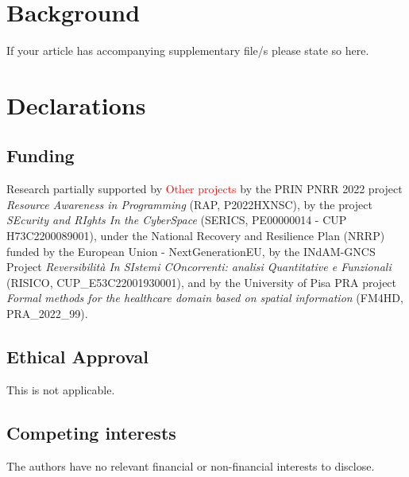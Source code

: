 \documentclass[sn-mathphys-num,a4paper,iicol,lineno,pdflatex]{sn-jnl-hacked}
\theoremstyle{thmwithspace}%
\theoremstyle{thmwithspace}%
\begin{document}
\section{Background}



















\backmatter


If your article has accompanying supplementary file/s please state so here. 


\section*{Declarations}

\subsection*{Funding}

Research partially supported 
by \textcolor{red}{Other projects}
by the PRIN PNRR 2022 project \emph{Resource Awareness in Programming} (RAP, P2022HXNSC),
by the project \emph{SEcurity and RIghts In the CyberSpace} (SERICS, PE00000014 - CUP H73C2200089001), under the National Recovery and Resilience Plan (NRRP) funded by the European Union - NextGenerationEU,
by the INdAM-GNCS Project \emph{Reversibilit\`a In SIstemi COncorrenti: analisi Quantitative e Funzionali} (RISICO,  CUP\_E53C22001930001),
and by the University of Pisa PRA project \emph{Formal methods for the healthcare domain based on spatial information} (FM4HD, PRA\_2022\_99).

\subsection*{Ethical Approval}
This is not applicable.
 
\subsection*{Competing interests}
The authors have no relevant financial or non-financial interests to disclose.
\end{document}
